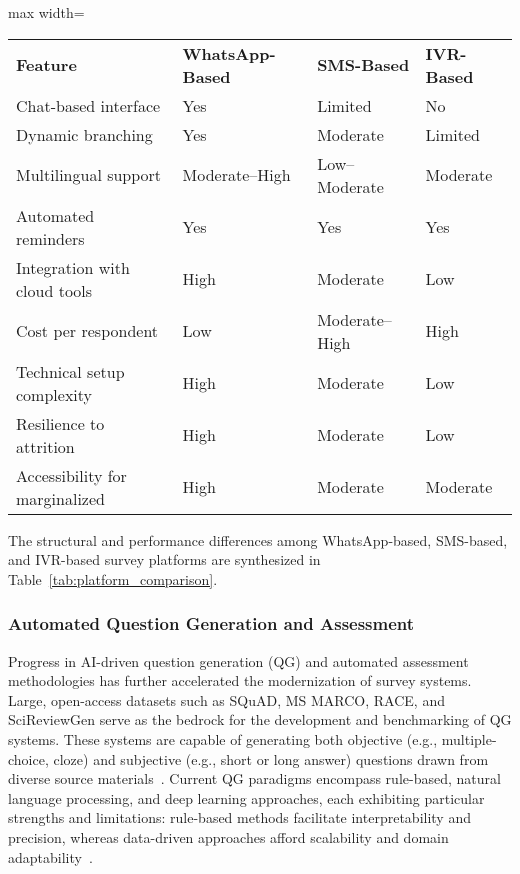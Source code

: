 \documentclass[sigconf]{acmart}
\begin{document}
\begin{table*}[htbp]
\centering
\caption{Comparative Features of Automated Survey Platforms Utilizing WhatsApp, SMS, and IVR}
\label{tab:platform_comparison}
\begin{adjustbox}{max width=\textwidth}
\begin{tabular}{@{}llll@{}}
\toprule
\textbf{Feature} & \textbf{WhatsApp-Based} & \textbf{SMS-Based} & \textbf{IVR-Based} \\
Chat-based interface & Yes & Limited & No \\
Dynamic branching & Yes & Moderate & Limited \\
Multilingual support & Moderate–High & Low–Moderate & Moderate \\
Automated reminders & Yes & Yes & Yes \\
Integration with cloud tools & High & Moderate & Low \\
Cost per respondent & Low & Moderate–High & High \\
Technical setup complexity & High & Moderate & Low \\
Resilience to attrition & High & Moderate & Low \\
Accessibility for marginalized & High & Moderate & Moderate \\
\bottomrule
\end{tabular}
\end{adjustbox}
\end{table*}

The structural and performance differences among WhatsApp-based, SMS-based, and IVR-based survey platforms are synthesized in Table~\ref{tab:platform_comparison}.

\subsubsection{Automated Question Generation and Assessment}

Progress in AI-driven question generation (QG) and automated assessment methodologies has further accelerated the modernization of survey systems. Large, open-access datasets such as SQuAD, MS MARCO, RACE, and SciReviewGen serve as the bedrock for the development and benchmarking of QG systems. These systems are capable of generating both objective (e.g., multiple-choice, cloze) and subjective (e.g., short or long answer) questions drawn from diverse source materials~\cite{ref1,ref2,ref3,ref39,ref40,ref44,ref48,ref50,ref72,ref84,ref86,ref88,ref89,ref90,ref96,ref97,ref104}. Current QG paradigms encompass rule-based, natural language processing, and deep learning approaches, each exhibiting particular strengths and limitations: rule-based methods facilitate interpretability and precision, whereas data-driven approaches afford scalability and domain adaptability~\cite{ref1,ref3,ref40,ref44}.
\end{document}
